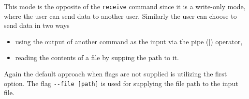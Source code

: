 This mode is the opposite of the \texttt{receive} command since it is a write-only mode, where the user can send data to another user. Similarly the user can choose to send data in two ways
\begin{itemize}
  \item using the output of another command as the input via the pipe (|) operator,
  \item reading the contents of a file by supping the path to it.
\end{itemize}
Again the default approach when flags are not supplied is utilizing the first option. The flag \texttt{-\--file [path]} is used for supplying the file path to the input file.
